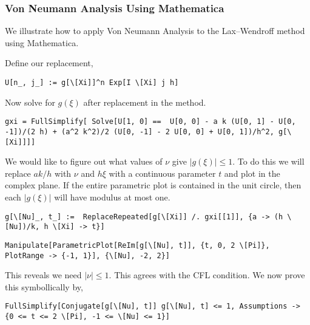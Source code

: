 \documentclass[12pt]{article}
\begin{document}
\subsubsection{Von Neumann Analysis Using Mathematica}
We illustrate how to apply Von Neumann Analysis to the Lax--Wendroff method using Mathematica.

Define our replacement,
\begin{lstlisting}
U[n_, j_] := g[\[Xi]]^n Exp[I \[Xi] j h]
\end{lstlisting}

Now solve for \( g(\xi) \) after replacement in the method.
\begin{lstlisting}
gxi = FullSimplify[ Solve[U[1, 0] ==  U[0, 0] - a k (U[0, 1] - U[0, -1])/(2 h) + (a^2 k^2)/2 (U[0, -1] - 2 U[0, 0] + U[0, 1])/h^2, g[\[Xi]]]]
\end{lstlisting}

We would like to figure out what values of \( \nu \) give \( |g(\xi)|\leq 1 \). To do this we will replace \( ak/h \) with \( \nu \) and \( h\xi \) with a continuous parameter \( t \) and plot in the complex plane. If the entire parametric plot is contained in the unit circle, then each \( |g(\xi)| \) will have modulus at most one.
\begin{lstlisting}
g[\[Nu]_, t_] :=  ReplaceRepeated[g[\[Xi]] /. gxi[[1]], {a -> (h \[Nu])/k, h \[Xi] -> t}]
\end{lstlisting}

\begin{lstlisting}
Manipulate[ParametricPlot[ReIm[g[\[Nu], t]], {t, 0, 2 \[Pi]}, PlotRange -> {-1, 1}], {\[Nu], -2, 2}]
\end{lstlisting}

This reveals we need \( |\nu| \leq 1 \). This agrees with the CFL condition. We now prove this symbollically by,
\begin{lstlisting}
FullSimplify[Conjugate[g[\[Nu], t]] g[\[Nu], t] <= 1, Assumptions -> {0 <= t <= 2 \[Pi], -1 <= \[Nu] <= 1}]
\end{lstlisting}
\end{document}
